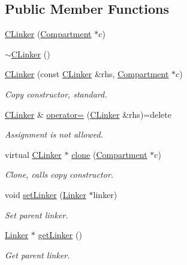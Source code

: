 \subsection*{Public Member Functions}
\begin{DoxyCompactItemize}
\item 
\hyperlink{classCLinker_a553ee3b26b16b70deaf78b153af39583}{C\+Linker} (\hyperlink{classCompartment}{Compartment} $\ast$c)
\item 
\hyperlink{classCLinker_a1735e2ca0212e6e1c0696d1f21ffebd5}{$\sim$\+C\+Linker} ()
\item 
\hyperlink{classCLinker_a8c28d338aed63e709cc2c9a449fd9d19}{C\+Linker} (const \hyperlink{classCLinker}{C\+Linker} \&rhs, \hyperlink{classCompartment}{Compartment} $\ast$c)
\begin{DoxyCompactList}\small\item\em Copy constructor, standard. \end{DoxyCompactList}\item 
\hyperlink{classCLinker}{C\+Linker} \& \hyperlink{classCLinker_a6aa5d662e52c5c0d726616647210f467}{operator=} (\hyperlink{classCLinker}{C\+Linker} \&rhs)=delete
\begin{DoxyCompactList}\small\item\em Assignment is not allowed. \end{DoxyCompactList}\item 
virtual \hyperlink{classCLinker}{C\+Linker} $\ast$ \hyperlink{classCLinker_ab1fba3ef14c902ed103e54c44ffa7538}{clone} (\hyperlink{classCompartment}{Compartment} $\ast$c)
\begin{DoxyCompactList}\small\item\em Clone, calls copy constructor. \end{DoxyCompactList}\item 
void \hyperlink{classCLinker_a2b0219ae91d2312bbf0c998b4d0b124e}{set\+Linker} (\hyperlink{classLinker}{Linker} $\ast$linker)
\begin{DoxyCompactList}\small\item\em Set parent linker. \end{DoxyCompactList}\item 
\hyperlink{classLinker}{Linker} $\ast$ \hyperlink{classCLinker_a5a1435f2035ecdadcc35b4ae90199865}{get\+Linker} ()
\begin{DoxyCompactList}\small\item\em Get parent linker. \end{DoxyCompactList}\item 

\end{DoxyCompactItemize}
